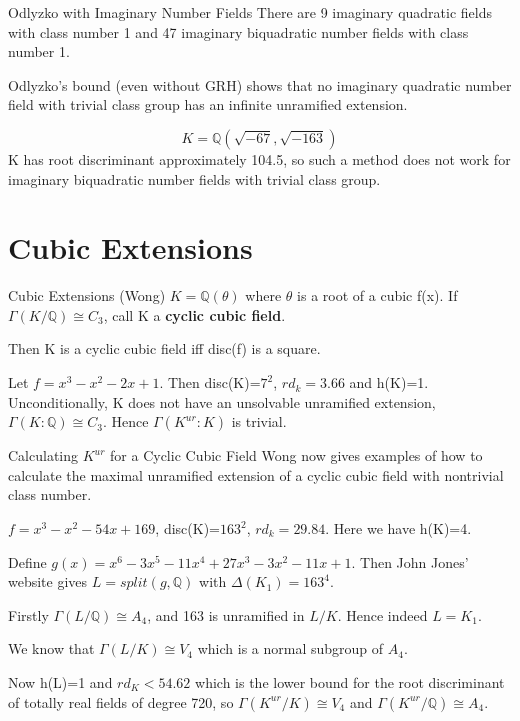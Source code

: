 \documentclass[10pt]{beamer}
\newcommand{\q}{\mathbb{Q}}
\theoremstyle{plain} %
\begin{document}
\begin{frame}{Odlyzko with Imaginary Number Fields}
    There are 9 imaginary quadratic fields with class number 1 and 47 imaginary biquadratic number fields with class number 1. \par Odlyzko's bound (even without GRH) shows that no imaginary quadratic number field with trivial class group has an infinite unramified extension. 
    \begin{example}
          \begin{equation}
        K=\q(\sqrt{-67},\sqrt{-163})
    \end{equation}
    K has root discriminant approximately 104.5, so such a method does not work for imaginary biquadratic number fields with trivial class group.
    \end{example}

\end{frame}
\section{Cubic Extensions}
\begin{frame}{Cubic Extensions (Wong) }
 $K=\mathbb{Q}(\theta)$ where $\theta$ is a root of a cubic
f(x). If $\Gamma(K/\mathbb{Q}) \cong C_3$, call K a  \textbf{cyclic cubic field}.
\begin{theorem}
Then K is a cyclic cubic field iff disc(f) is a square. 
\end{theorem}
\begin{example}
    Let $f=x^3-x^2-2x+1$. Then disc(K)=$7^2$, $rd_{k}=3.66$ and h(K)=1. Unconditionally, K does not have an unsolvable unramified extension, $\Gamma(K:\mathbb{Q})\cong C_3$. Hence $\Gamma(K^{ur}:K) $ is trivial.
\end{example}
\end{frame}

\begin{frame}{Calculating $K^{ur}$ for a Cyclic Cubic Field}
    Wong now gives examples of how to calculate the maximal unramified extension of a cyclic cubic field with nontrivial class number. \begin{example}
    $f=x^3-x^2-54x+169$, disc(K)=$163^2$, $rd_{k}=29.84$. Here we have h(K)=4.\par Define $g(x)=x^6-3x^5-11x^4+27x^3-3x^2-11x+1$. Then John Jones' website gives $L = split(g,\mathbb{Q})$ with $\Delta(K_1)=163^4$.\par Firstly $\Gamma(L/\mathbb{Q}) \cong A_4$, and 163 is unramified in $L/K$. Hence indeed $L=K_1$.\par  We know that $\Gamma(L/K)\cong V_4$ which is a normal subgroup of $A_4$. \par Now h(L)=1 and $rd_K < 54.62$ which is the lower bound for the root discriminant of totally real fields of degree 720, so $\Gamma(K^{ur}/K) \cong V_4$ and $\Gamma(K^{ur}/\mathbb{Q}) \cong A_4$. 
\end{example}
\end{frame}
\end{document}
